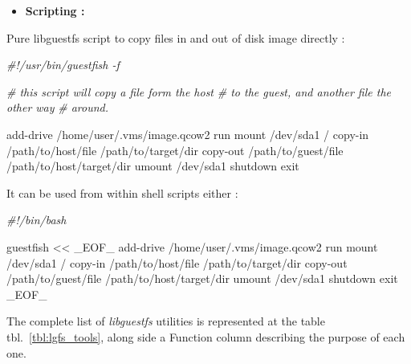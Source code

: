 \documentclass[
  14pt,
  english,
  a4paper,
]{scrreprt}
\newenvironment{Shaded}{}{}
\newcommand{\BuiltInTok}[1]{#1}
\newcommand{\CommentTok}[1]{\textcolor[rgb]{0.38,0.63,0.69}{\textit{#1}}}
\newcommand{\ExtensionTok}[1]{#1}
\newcommand{\FunctionTok}[1]{\textcolor[rgb]{0.02,0.16,0.49}{#1}}
\newcommand{\NormalTok}[1]{#1}
\newcommand{\OperatorTok}[1]{\textcolor[rgb]{0.40,0.40,0.40}{#1}}
\providecommand{\tightlist}{%
  \setlength{\itemsep}{0pt}\setlength{\parskip}{0pt}}
\begin{document}
\begin{itemize}
\tightlist
\item
  \textbf{Scripting :}
\end{itemize}

Pure libguestfs script to copy files in and out of disk image directly :

\begin{Shaded}
\begin{Highlighting}[]
\CommentTok{\#!/usr/bin/guestfish {-}f}

\CommentTok{\# this script will copy a file form the host}
\CommentTok{\# to the guest, and another file the other way}
\CommentTok{\# around.}

\ExtensionTok{add{-}drive}\NormalTok{ /home/user/.vms/image.qcow2}
\ExtensionTok{run}
\FunctionTok{mount}\NormalTok{ /dev/sda1 /}
\ExtensionTok{copy{-}in}\NormalTok{ /path/to/host/file /path/to/target/dir}
\ExtensionTok{copy{-}out}\NormalTok{ /path/to/guest/file /path/to/host/target/dir}
\FunctionTok{umount}\NormalTok{ /dev/sda1}
\ExtensionTok{shutdown}
\BuiltInTok{exit}
\end{Highlighting}
\end{Shaded}

It can be used from within shell scripts either :

\begin{Shaded}
\begin{Highlighting}[]

\CommentTok{\#!/bin/bash}

\ExtensionTok{guestfish} \OperatorTok{\textless{}\textless{} \_EOF\_}
\NormalTok{add{-}drive /home/user/.vms/image.qcow2}
\NormalTok{run}
\NormalTok{mount /dev/sda1 /}
\NormalTok{copy{-}in /path/to/host/file /path/to/target/dir}
\NormalTok{copy{-}out /path/to/guest/file /path/to/host/target/dir}
\NormalTok{umount /dev/sda1}
\NormalTok{shutdown}
\NormalTok{exit}
\OperatorTok{\_EOF\_}
\end{Highlighting}
\end{Shaded}

The complete list of \emph{libguestfs} utilities is represented at the
table tbl.~\ref{tbl:lgfs_tools}, along side a Function column describing
the purpose of each one.
\end{document}
